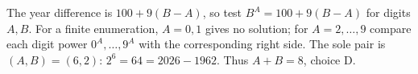 The year difference is $100+9(B-A)$, so test $B^A=100+9(B-A)$ for digits $A,B$. For a finite enumeration, $A=0,1$ gives no solution; for $A=2,\ldots,9$ compare each digit power $0^A,\ldots,9^A$ with the corresponding right side. The sole pair is $(A,B)=(6,2)$: $2^6=64=2026-1962$. Thus $\boxed{A+B=8}$, choice D.
